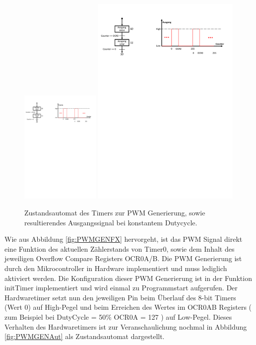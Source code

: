 \documentclass[a4paper, 11pt]{report}
\begin{document}
\begin{figure}[htp]
	\centering
        {\includegraphics[width=0.34\textwidth]{rec/zustandsautomatPWM.pdf}}
        \hfill
        {\includegraphics[width=0.64\textwidth]{rec/graphPWM.pdf}}
    \caption{Zustandsautomat des Timers zur PWM Generierung, sowie resultierendes Ausgangssignal bei konstantem Dutycycle.}


\end{figure}




Wie aus Abbildung \ref{fig:PWMGENFX} hervorgeht, ist das PWM Signal direkt eine Funktion des aktuellen Zählerstands von Timer0, sowie dem Inhalt des jeweiligen Overflow Compare Registers OCR0A/B.
Die PWM Generierung ist durch den Mikrocontroller in Hardware implementiert und muss lediglich aktiviert werden. Die Konfiguration dieser PWM Generierung ist in der Funktion initTimer implementiert und wird einmal zu Programmstart aufgerufen. Der Hardwaretimer setzt nun den jeweiligen Pin beim Überlauf des 8-bit Timers (Wert 0) auf High-Pegel und beim Erreichen des Wertes im OCR0AB Registers ( zum Beispiel  bei DutyCycle = 50\% OCR0A = 127 ) auf Low-Pegel.
Dieses Verhalten des Hardwaretimers ist zur Veranschaulichung nochmal in Abbildung  \ref{fig:PWMGENAut} als Zustandsautomat dargestellt.
\end{document}

